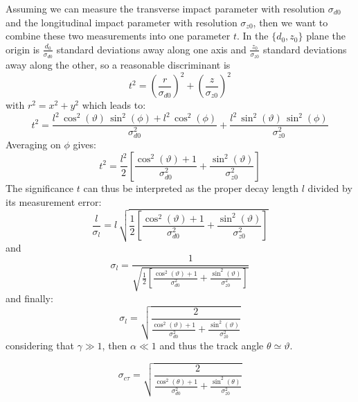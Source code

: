 \documentclass[10pt,a4paper]{article}
\begin{document}
Assuming we can measure the transverse impact parameter with
resolution $\sigma_{d0}$ and the longitudinal impact parameter with
resolution $\sigma_{z0}$, then we want to combine these two
measurements into one parameter $t$. In the $\{d_0, z_0\}$ plane the
origin is $\frac{d_0}{\sigma_{d0}}$ standard deviations away along one
axis and $\frac{z_0}{\sigma_{z0}}$ standard deviations away along the
other, so a reasonable discriminant is
\begin{equation}
t^2 = \left ( \frac {r} {\sigma_{d0}} \right )^2 + 
              \left ( \frac {z} {\sigma_{z0}} \right )^2
\end{equation}
with $r^2=x^2+y^2$ which leads to:
\begin{equation}
t^2 = \frac {l^2\,\cos^2(\vartheta)\,\sin^2(\phi) + l^2\,\cos^2(\phi)} {\sigma_{d0}^2} + 
    \frac {l^2\,\sin^2(\vartheta)\,\sin^2(\phi)} {\sigma_{z0}^2}
\end{equation}
Averaging on $\phi$ gives:
\begin{equation}
  t^2 = \frac {l^2} {2} \left [ \frac {\cos^2(\vartheta) + 1 } {\sigma_{d0}^2} + 
        \frac {\sin^2(\vartheta)} {\sigma_{z0}^2} \right ]
\end{equation}
The significance $t$ can thus be interpreted as the proper decay
length $l$ divided by its measurement error:
\begin{equation}
\frac {l} {\sigma_l} = l \, \sqrt{ \frac 1 2 \left [ \frac {\cos^2(\vartheta) + 1 } {\sigma_{d0}^2} + 
                                   \frac {\sin^2(\vartheta)} {\sigma_{z0}^2} \right ] }
\end{equation}
and 
\begin{equation}
\sigma_l = \frac 1 { \sqrt{ \frac 1 2 \left [ \frac {\cos^2(\vartheta) + 1 } {\sigma_{d0}^2} + 
                                   \frac {\sin^2(\vartheta)} {\sigma_{z0}^2} \right ] } }
\end{equation}
and finally:
\begin{equation}
\sigma_l = \sqrt{ \frac 2 {  \frac {\cos^2(\vartheta) + 1 } {\sigma_{d0}^2} + 
                                   \frac {\sin^2(\vartheta)} {\sigma_{z0}^2} } }
\end{equation}
considering that $\gamma \gg 1$, then $\alpha \ll 1$ and thus the track angle $\theta \simeq \vartheta$.

\begin{equation}
\sigma_{c\tau} = \sqrt{ \frac 2 {  \frac {\cos^2(\theta) + 1 } {\sigma_{d0}^2} + 
                                   \frac {\sin^2(\theta)} {\sigma_{z0}^2} } }
\end{equation}
\end{document}
